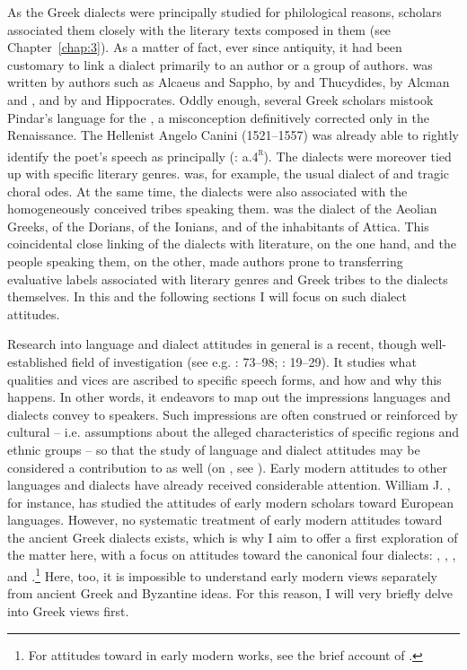As the Greek dialects were principally studied for philological reasons, scholars associated them closely with the literary texts composed in them (see Chapter~\ref{chap:3}). As a matter of fact, ever since antiquity, it had been customary to link a dialect primarily to an author or a group of authors.  was written by authors such as Alcaeus and Sappho,  by  and Thucydides,  by Alcman and , and  by  and Hippocrates. Oddly enough, several Greek scholars mistook Pindar’s language for the , a misconception definitively corrected only in the Renaissance. The  Hellenist Angelo Canini (1521–1557) was already able to rightly identify the poet’s speech as principally  (\citealt{Canini1555}: a.4\textsc{\textsuperscript{r}}). The dialects were moreover tied up with specific literary genres.  was, for example, the usual dialect of  and tragic choral odes. At the same time, the dialects were also associated with the homogeneously conceived tribes speaking them.  was the dialect of the Aeolian Greeks,  of the Dorians,  of the Ionians, and  of the inhabitants of Attica. This coincidental close linking of the dialects with literature, on the one hand, and the people speaking them, on the other, made authors prone to transferring evaluative labels associated with literary genres and Greek tribes to the dialects themselves. In this and the following sections I will focus on such dialect attitudes.

Research into language and dialect attitudes in general is a recent, though well-established field of investigation (see e.g. \citealt{Edwards2009}: 73–98; \citealt{Garrett2010}: 19–29). It studies what qualities and vices are ascribed to specific speech forms, and how and why this happens. In other words, it endeavors to map out the impressions languages and dialects convey to speakers. Such impressions are often construed or reinforced by cultural  – i.e. assumptions about the alleged characteristics of specific regions and ethnic groups – so that the study of language and dialect attitudes may be considered a contribution to  as well (on , see \citealt{BellerLeerssen2007}). Early modern attitudes to other languages and dialects have already received considerable attention. William J. \citet{Jones1999}, for instance, has studied the attitudes of early modern  scholars toward European languages. However, no systematic treatment of early modern attitudes toward the ancient Greek dialects exists, which is why I aim to offer a first exploration of the matter here, with a focus on attitudes toward the canonical four dialects: , , , and .\footnote{For attitudes toward  in early modern  works, see the brief account of \citet[251--252]{Roelcke2014}.} Here, too, it is impossible to understand early modern views separately from ancient Greek and Byzantine ideas. For this reason, I will very briefly delve into Greek views first.

